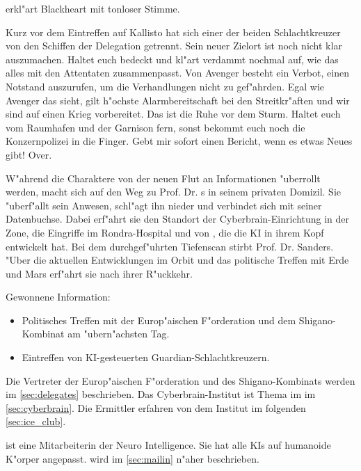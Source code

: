 erkl"art Blackheart mit tonloser Stimme. 

\begin{speech}
	Kurz vor dem Eintreffen auf Kallisto hat sich einer der beiden Schlachtkreuzer von den Schiffen der Delegation getrennt. Sein neuer Zielort ist noch nicht klar auszumachen. Haltet euch bedeckt und kl"art verdammt nochmal auf, wie das alles mit den Attentaten zusammenpasst. Von Avenger besteht ein Verbot, einen Notstand auszurufen, um die Verhandlungen nicht zu gef"ahrden. Egal wie Avenger das sieht, gilt h"ochste Alarmbereitschaft bei den Streitkr"aften und wir sind auf einen Krieg vorbereitet. Das ist die Ruhe vor dem Sturm. Haltet euch vom Raumhafen und der Garnison fern, sonst bekommt euch noch die Konzernpolizei in die Finger. Gebt mir sofort einen Bericht, wenn es etwas Neues gibt! Over.
\end{speech}


W"ahrend die Charaktere von der neuen Flut an Informationen "uberrollt werden, macht sich \xl{} auf den Weg zu Prof. Dr. 	s in seinem privaten Domizil. Sie "uberf"allt sein Anwesen, schl"agt ihn nieder und verbindet sich mit seiner Datenbuchse. Dabei erf"ahrt sie den Standort der Cyberbrain-Einrichtung in der Zone, die Eingriffe im Rondra-Hospital und von \ml{}, die die KI in ihrem Kopf entwickelt hat. Bei dem durchgef"uhrten Tiefenscan stirbt Prof. Dr. Sanders. "Uber die aktuellen Entwicklungen im Orbit und das politische Treffen mit Erde und Mars erf"ahrt sie nach ihrer R"uckkehr.

\begin{remarks}
	Gewonnene Information: 
	
	\begin{itemize}
		\item Politisches Treffen mit der Europ"aischen F"orderation und dem Shigano-Kombinat am "ubern"achsten Tag.
		\item Eintreffen von KI-gesteuerten Guardian-Schlachtkreuzern.
	\end{itemize}

	Die Vertreter der Europ"aischen F"orderation und des Shigano-Kombinats werden im 	\cref{sec:delegates} beschrieben.
	Das Cyberbrain-Institut ist Thema im im \cref{sec:cyberbrain}. Die Ermittler erfahren von dem Institut im folgenden 
	\cref{sec:ice_club}.

	\ml{} ist eine Mitarbeiterin der Neuro Intelligence. Sie hat alle KIs auf humanoide K"orper angepasst. \ml{} wird im
	\cref{sec:mailin} n"aher beschrieben.
\end{remarks}
